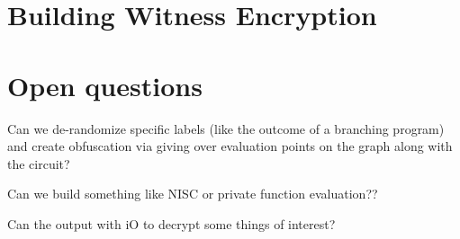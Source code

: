 


\section{Building Witness Encryption}

\section{Open questions}
Can we de-randomize specific labels (like the outcome of a branching program) and create obfuscation
via giving over evaluation points on the graph along with the circuit?


Can we build something like NISC or private function evaluation??

Can the output with iO to decrypt some things of interest?